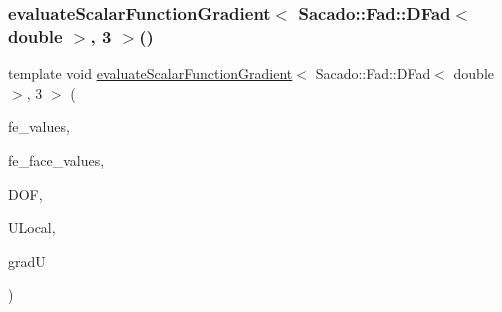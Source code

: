 \subsubsection{\texorpdfstring{evaluate\+Scalar\+Function\+Gradient$<$ Sacado\+::\+Fad\+::\+D\+Fad$<$ double $>$, 3 $>$()}{evaluateScalarFunctionGradient< Sacado::Fad::DFad< double >, 3 >()}\hspace{0.1cm}{\footnotesize\ttfamily [3/4]}}
{\footnotesize\ttfamily template void \mbox{\hyperlink{group___evaluation_functions_gabedd4ae2841d2332ed0df0513b189e34}{evaluate\+Scalar\+Function\+Gradient}}$<$ Sacado\+::\+Fad\+::\+D\+Fad$<$ double $>$, 3 $>$ (\begin{DoxyParamCaption}\item[{const F\+E\+Values$<$ 3 $>$ \&}]{fe\+\_\+values,  }\item[{const F\+E\+Face\+Values$<$ 3 $>$ \&}]{fe\+\_\+face\+\_\+values,  }\item[{unsigned int}]{D\+OF,  }\item[{Table$<$ 1, Sacado\+::\+Fad\+::\+D\+Fad$<$ double $>$$>$ \&}]{U\+Local,  }\item[{Table$<$ 2, Sacado\+::\+Fad\+::\+D\+Fad$<$ double $>$$>$ \&}]{gradU }\end{DoxyParamCaption})}

\mbox{\label{function_evaluations_8cc_a28b649ef8b832ed57cd596b5a68d62c2}} 
